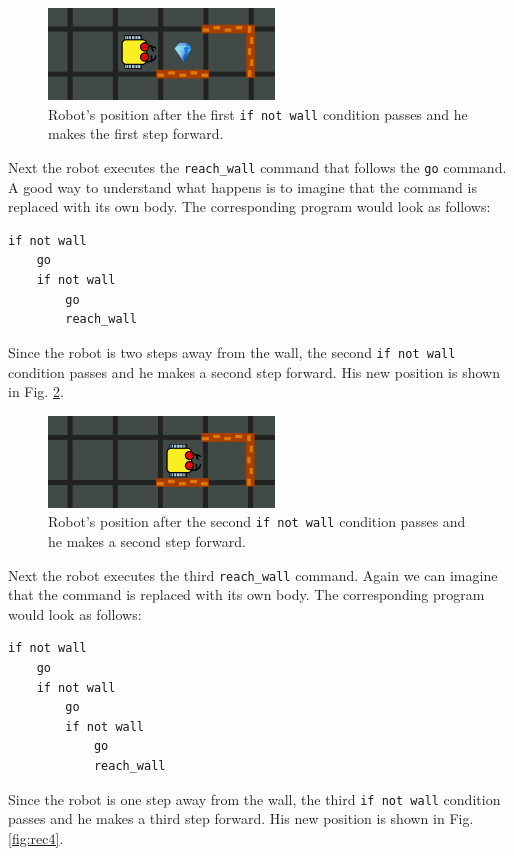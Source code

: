 \begin{figure}[!ht]
\begin{center}
\includegraphics[width=6cm]{imgk/rec-2.png}
\end{center}
\vspace{-4mm}
\caption{Robot's position after the first {\tt if not wall} condition passes and he makes the first step forward.}
\label{fig:rec2}
\vspace{-4mm}
\end{figure}
\noindent
Next the robot executes the {\tt reach\_wall} command that follows the {\tt go} command. A good way to 
understand what happens is to imagine that the command is replaced with its own body. The corresponding 
program would look as follows:

\begin{verbatim}
if not wall
    go
    if not wall
        go
        reach_wall
\end{verbatim}
\noindent
Since the robot is two steps away from the wall, the second {\tt if not wall} condition passes and 
he makes a second step forward. His new position is shown in Fig. \ref{fig:rec3}.

\begin{figure}[!ht]
\begin{center}
\includegraphics[width=6cm]{imgk/rec-3.png}
\end{center}
\vspace{-4mm}
\caption{Robot's position after the second {\tt if not wall} condition passes and he makes a second step forward.}
\label{fig:rec3}
\vspace{-4mm}
\end{figure}
\noindent
Next the robot executes the third {\tt reach\_wall} command. Again we can imagine that the command 
is replaced with its own body. The corresponding program would look as follows:

\begin{verbatim}
if not wall
    go
    if not wall
        go
        if not wall
            go
            reach_wall
\end{verbatim}
\noindent
Since the robot is one step away from the wall, the third {\tt if not wall} condition passes and 
he makes a third step forward. His new position is shown in Fig. \ref{fig:rec4}.

